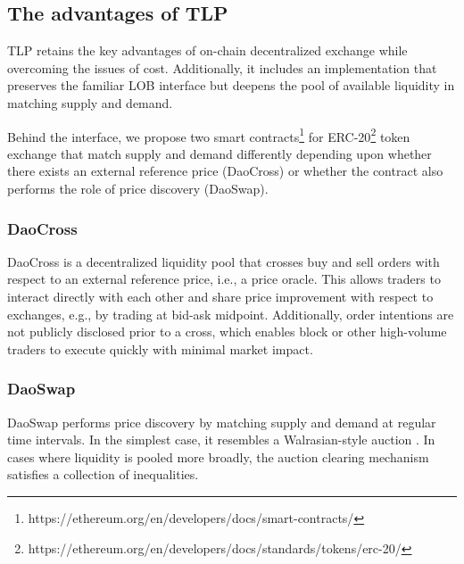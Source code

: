 \documentclass[11pt, reqno]{amsart}
\theoremstyle{definition}
\theoremstyle{remark}
\begin{document}
\subsection{The advantages of TLP}

TLP retains the key advantages of on-chain decentralized exchange while
overcoming the issues of cost. Additionally, it includes an implementation
that preserves the familiar LOB interface but deepens the pool of available
liquidity in matching supply and demand.

Behind the interface, we propose two smart
contracts\footnote{https://ethereum.org/en/developers/docs/smart-contracts/}
for
ERC-20\footnote{https://ethereum.org/en/developers/docs/standards/tokens/erc-20/}
token exchange that match supply and demand differently depending upon whether
there exists an external reference price (DaoCross) or whether the contract
also performs the role of price discovery (DaoSwap).

\subsubsection{DaoCross}
DaoCross is a decentralized liquidity pool that crosses buy and sell orders
with respect to an external reference price, i.e., a price oracle. This allows
traders to interact directly with each other and share price improvement with
respect to exchanges, e.g., by trading at bid-ask midpoint. Additionally, order
intentions are not publicly disclosed prior to a cross, which enables block or
other high-volume traders to execute quickly with minimal market impact.

\subsubsection{DaoSwap}
DaoSwap performs price discovery by matching supply and demand at regular time
intervals. In the simplest case, it resembles a Walrasian-style auction
\cite{Wa}. In cases where liquidity is pooled more broadly, the auction clearing
mechanism satisfies a collection of inequalities.
\end{document}
